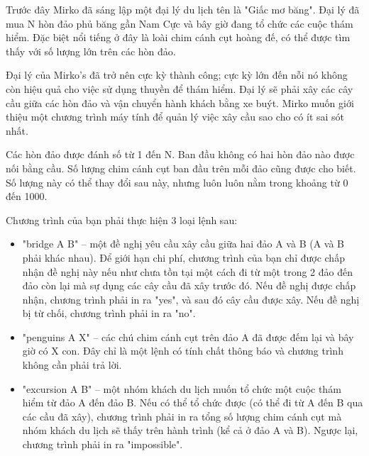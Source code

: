 Trước đây Mirko đã sáng lập một đại lý du lịch tên là "Giấc mơ băng". Đại lý đã mua N hòn đảo phủ băng gần Nam Cực và bây giờ đang tổ chức các cuộc thám hiểm. Đặc biệt nổi tiếng ở đây là loài chim cánh cụt hoàng đế, có thể được tìm thấy với số lượng lớn trên các hòn đảo.  

   Đại lý của Mirko's đã trở nên cực kỳ thành công; cực kỳ lớn đến nỗi nó không còn hiệu quả cho việc sử dụng thuyền để thám hiểm. Đại lý sẽ phải xây các cây cầu giữa các hòn đảo và vận chuyển hành khách bằng xe buýt. Mirko muốn giới thiệu một chương trình máy tính để quản lý việc xây cầu sao cho có ít sai sót nhất.  

   Các hòn đảo được đánh số từ 1 đến N. Ban đầu không có hai hòn đảo nào được nối bằng cầu. Số lượng chim cánh cụt ban đầu trên mỗi đảo cũng được cho biết. Số lượng này có thể thay đổi sau này, nhưng luôn luôn nằm trong khoảng từ 0 đến 1000.  

   Chương trình của bạn phải thực hiện 3 loại lệnh sau:  
\begin{itemize}
	\item     "bridge A B" – một đề nghị yêu cầu xây cầu giữa hai đảo A và B (A và B phải khác nhau). Để giới hạn chi phí, chương trình của bạn chỉ được chấp nhận đề nghị này nếu như chưa tồn tại một cách đi từ một trong 2 đảo đến đảo còn lại mà sự dụng các cây cầu đã xây trước đó. Nếu đề nghị được chấp nhận, chương trình phải in ra "yes", và sau đó cây cầu được xây. Nếu đề nghị bị từ chối, chương trình phải in ra "no".   
	\item     "penguins A X" – các chú chim cánh cụt trên đảo A đã được đếm lại và bây giờ có X con. Đây chỉ là một lệnh có tính chất thông báo và chương trình không cần phải trả lời.   
	\item     "excursion A B" – một nhóm khách du lịch muốn tổ chức một cuộc thám hiểm từ đảo A đến đảo B. Nếu có thể tổ chức được (có thể đi từ A đến B qua các cầu đã xây), chương trình phải in ra tổng số lượng chim cánh cụt mà nhóm khách du lịch sẽ thấy trên hành trình (kể cả ở đảo A và B). Ngược lại, chương trình phải in ra "impossible".   
\end{itemize}



\